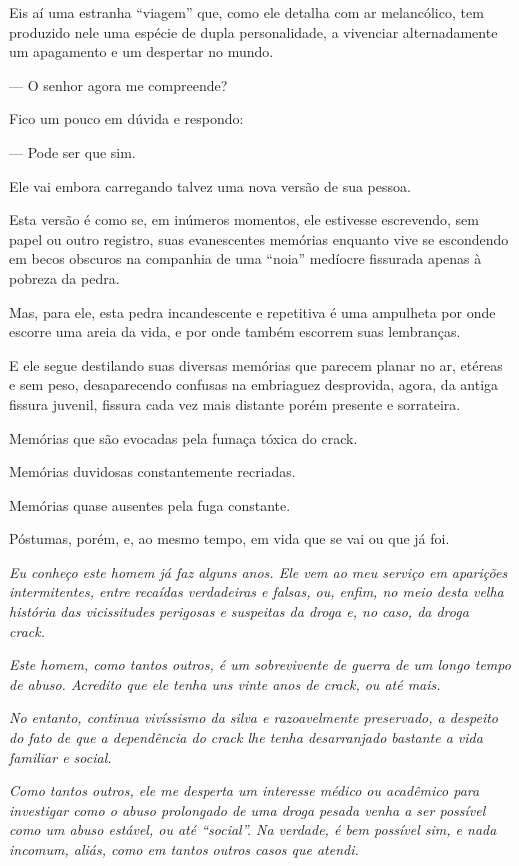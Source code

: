 Eis aí uma estranha ``viagem'' que, como ele detalha com ar melancólico,
tem produzido nele uma espécie de dupla personalidade, a vivenciar
alternadamente um apagamento e um despertar no mundo.

— O senhor agora me compreende?

Fico um pouco em dúvida e respondo:

— Pode ser que sim.

Ele vai embora carregando talvez uma nova versão de sua pessoa.

Esta versão é como se, em inúmeros momentos, ele estivesse escrevendo,
sem papel ou outro registro, suas evanescentes memórias enquanto vive se
escondendo em becos obscuros na companhia de uma ``noia'' medíocre
fissurada apenas à pobreza da pedra.

Mas, para ele, esta pedra incandescente e repetitiva é uma ampulheta por
onde escorre uma areia da vida, e por onde também escorrem suas
lembranças.

E ele segue destilando suas diversas memórias que parecem planar no ar,
etéreas e sem peso, desaparecendo confusas na embriaguez desprovida,
agora, da antiga fissura juvenil, fissura cada vez mais distante porém
presente e sorrateira.

Memórias que são evocadas pela fumaça tóxica do crack.

Memórias duvidosas constantemente recriadas.

Memórias quase ausentes pela fuga constante.

Póstumas, porém, e, ao mesmo tempo, em vida que se vai ou que já foi.

\begin{center}\asterisc{}\end{center}


\emph{Eu conheço este homem já faz alguns anos. Ele vem ao meu serviço
em aparições intermitentes, entre recaídas verdadeiras e falsas, ou,
enfim, no meio desta velha história das vicissitudes perigosas e
suspeitas da droga e, no caso, da droga crack.}~

\emph{Este homem, como tantos outros, é um sobrevivente de guerra de um
longo tempo de abuso. Acredito que ele tenha uns vinte anos de crack, ou
até mais.}~

\emph{No entanto, continua vivíssismo da silva e razoavelmente
preservado, a despeito do fato de que a dependência do crack lhe tenha
desarranjado bastante a vida familiar e social.}~

\emph{Como tantos outros, ele me desperta um interesse médico ou
acadêmico para investigar como o abuso prolongado de uma droga pesada
venha a ser possível como um abuso estável, ou até ``social''. Na
verdade, é bem possível sim, e nada incomum, aliás, como em tantos outros
casos que atendi.}~


